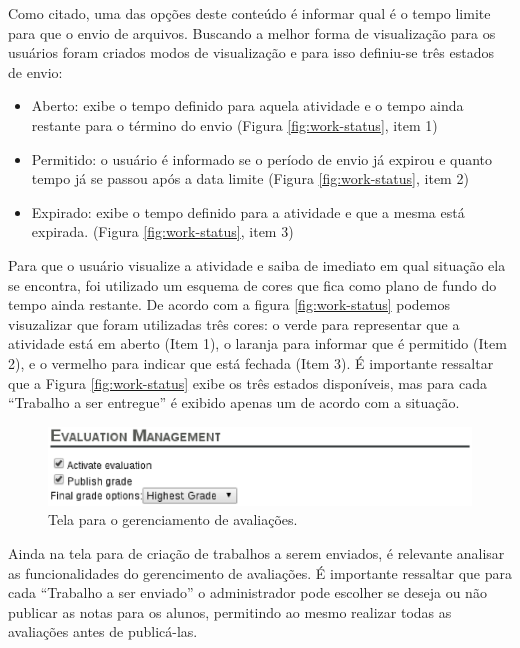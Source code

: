 Como citado, uma das opções deste conteúdo é informar qual é o tempo limite para que o envio de arquivos. Buscando a melhor forma de visualização para os usuários foram criados modos de visualização e para isso definiu-se três estados de envio:

\begin{itemize}
\item Aberto: exibe o tempo definido para aquela atividade e o tempo ainda restante para o término do envio (Figura \ref{fig:work-status}, item 1)
\item Permitido: o usuário é informado se o período de envio já expirou e quanto tempo já se passou após a data limite (Figura \ref{fig:work-status}, item 2)
\item Expirado: exibe o tempo definido para a atividade e que a mesma está expirada. (Figura \ref{fig:work-status}, item 3)
\end{itemize}

Para que o usuário visualize a atividade e saiba de imediato em qual situação ela se encontra, foi utilizado um esquema de cores que fica como plano de fundo do tempo ainda restante. De acordo com a figura \ref{fig:work-status} podemos visuzalizar que foram utilizadas três cores: o verde para representar que a atividade está em aberto (Item 1), o laranja para informar que é permitido (Item 2), e o vermelho para indicar que está fechada (Item 3). É importante ressaltar que a Figura \ref{fig:work-status} exibe os três estados disponíveis, mas para cada ``Trabalho a ser entregue'' é exibido apenas um de acordo com a situação.

\begin{figure}[h]
    \centering
    \includegraphics[keepaspectratio=true,scale=0.75]
      {figuras/evaluation-management.eps}
    \caption{Tela para o gerenciamento de avaliações.}
    \label{fig:evaluation-management}
\end{figure}

Ainda na tela para de criação de trabalhos a serem enviados, é relevante analisar as funcionalidades do gerencimento de avaliações. É importante ressaltar que para cada ``Trabalho a ser enviado'' o administrador pode escolher se deseja ou não publicar as notas para os alunos, permitindo ao mesmo realizar todas as avaliações antes de publicá-las.

